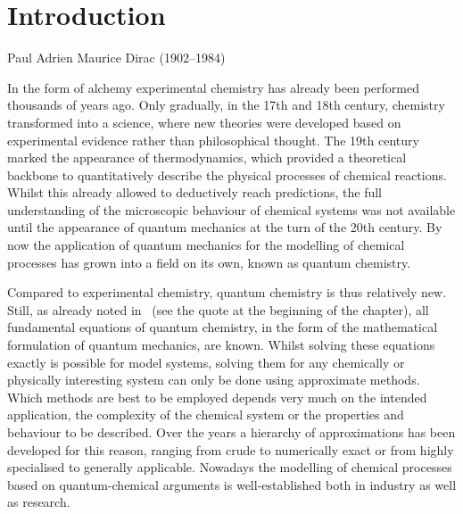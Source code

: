 \chapter{Introduction}
{Paul Adrien Maurice Dirac (1902--1984)}

\noindent
In the form of alchemy experimental chemistry
has already been performed thousands of years ago.
Only gradually,
in the 17th and 18th century,
chemistry transformed into a science,
where new theories were developed based on
experimental evidence rather than philosophical thought.
The 19th century marked the appearance of thermodynamics,
which provided a theoretical backbone
to quantitatively describe the physical processes of chemical reactions.
Whilst this already allowed to deductively reach predictions,
the full understanding of the microscopic behaviour
of chemical systems was not available until the appearance
of quantum mechanics at the turn of the 20th century.
By now the application of quantum mechanics for the modelling of chemical processes
has grown into a field on its own, known as quantum chemistry.

Compared to experimental chemistry, quantum chemistry is thus relatively new.
Still, as \citet{Dirac1929} already noted in \citeyear{Dirac1929}%
~(see the quote at the beginning of the chapter),
all fundamental equations of quantum chemistry,
in the form of the mathematical formulation of quantum mechanics, are known.
Whilst solving these equations exactly is possible for model systems,
solving them for any chemically or physically
interesting system can only be done using approximate methods.
Which methods are best to be employed depends very much on
the intended application,
\ie the complexity of the chemical system
or the properties and behaviour to be described.
Over the years a hierarchy of approximations has been developed for this reason,
ranging from crude to numerically exact
or from highly specialised to generally applicable.
Nowadays the modelling of chemical processes
based on quantum-chemical arguments
is well-established both in industry as well as research.

